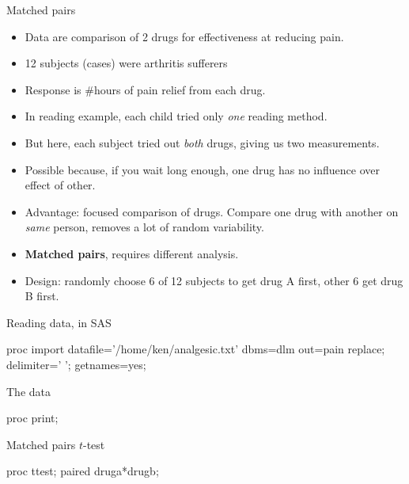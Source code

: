 \documentclass[unknownkeysallowed]{beamer}\usepackage[]{graphicx}\usepackage[]{color}
\begin{document}
\begin{frame}[fragile]{Matched pairs}
  
  \begin{itemize}
  \item Data are comparison of 2 drugs for effectiveness at reducing pain.
  \item 12 subjects (cases) were arthritis sufferers
  \item Response is \#hours of pain relief from each drug.
  \item In reading example, each child tried only \emph{one} reading method.
  \item But here, each subject tried out \emph{both} drugs, giving us
    two measurements.
  \item Possible because, if you wait long enough, one drug has no
    influence over effect of other.
  \item Advantage: focused comparison of drugs. Compare one drug with
    another on \emph{same} person, removes a lot of random variability.
  \item \textbf{Matched pairs}, requires different analysis.
  \item Design: randomly choose 6 of 12 subjects to get drug A first,
    other 6 get drug B first.
  \end{itemize}

\end{frame}

\begin{frame}[fragile]{Reading data, in SAS}


\begin{Datastep}
proc import
  datafile='/home/ken/analgesic.txt'
    dbms=dlm
    out=pain
    replace;
  delimiter=' ';
  getnames=yes;
\end{Datastep}


  
\end{frame}

\begin{frame}[fragile]{The data}
  
  \begin{Sascode}[store=iz]
proc print;    
  \end{Sascode}
  
  
\end{frame}

\begin{frame}[fragile]{Matched pairs $t$-test}

  \begin{Sascode}[store=ic]
proc ttest;
  paired druga*drugb;
\end{Sascode}


\end{frame}
\end{document}
